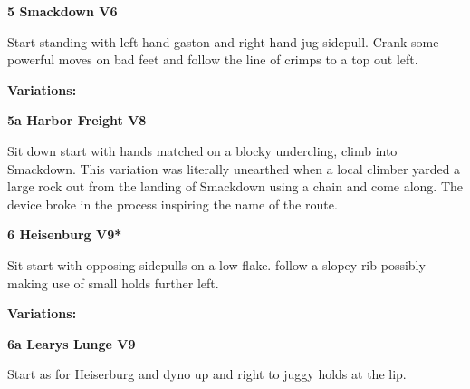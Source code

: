 	\begin{multicols}{2}


\needspace{1.5cm}
\label{rt:Smackdown}
\colorbox{RoyalBlue!20}{
\parbox{0.95\linewidth}{
\textbf{
5 Smackdown V6  
}}}
\begin{adjustwidth}{0.5cm}{}			
Start standing with left hand gaston and right hand jug sidepull. Crank some powerful moves on bad feet and follow the line of crimps to a top out left.
\end{adjustwidth}


\begin{adjustwidth}{0.5cm}{}				
\needspace{3cm}
\textbf{Variations:} \newline

\needspace{1.5cm}
\label{vr:Harbor Freight}
\colorbox{Goldenrod!20}{
\parbox{0.95\linewidth}{
\textbf{
5a Harbor Freight V8  
}}}
\begin{adjustwidth}{0.5cm}{}			
Sit down start with hands matched on a blocky undercling, climb into Smackdown. This variation was literally unearthed when a local climber yarded a large rock out from the landing of Smackdown using a chain and come along. The device broke in the process inspiring the name of the route.
\end{adjustwidth}



\end{adjustwidth}


\needspace{1.5cm}
\label{rt:Heisenburg}
\colorbox{Goldenrod!20}{
\parbox{0.95\linewidth}{
\textbf{
6 Heisenburg V9*  
}}}
\begin{adjustwidth}{0.5cm}{}			
Sit start with opposing sidepulls on a low flake. follow a slopey rib possibly making use of small holds further left.
\end{adjustwidth}


\begin{adjustwidth}{0.5cm}{}				
\needspace{3cm}
\textbf{Variations:} \newline

\needspace{1.5cm}
\label{vr:Learys Lunge}
\colorbox{Goldenrod!20}{
\parbox{0.95\linewidth}{
\textbf{
6a Learys Lunge V9  
}}}
\begin{adjustwidth}{0.5cm}{}			
Start as for Heiserburg and dyno up and right to juggy holds at the lip.
\end{adjustwidth}



\end{adjustwidth}



\end{multicols}
